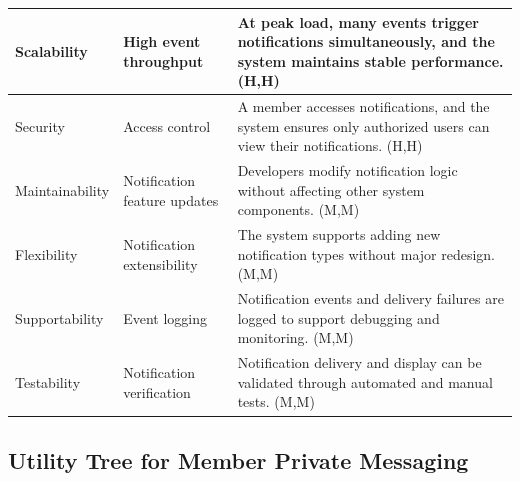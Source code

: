 \documentclass{article}
\begin{document}
\begin{table}[H]
\begin{tabular}{|p{3cm}|p{4cm}|p{7cm}|}
        Scalability
                                   & High event throughput
                                   & At peak load, many events trigger notifications simultaneously, and the system maintains stable performance. (H,H)                              \\
        \hline

        Security
                                   & Access control
                                   & A member accesses notifications, and the system ensures only authorized users can view their notifications. (H,H)                               \\
        \hline

        Maintainability
                                   & Notification feature updates
                                   & Developers modify notification logic without affecting other system components. (M,M)                                                           \\
        \hline

        Flexibility
                                   & Notification extensibility
                                   & The system supports adding new notification types without major redesign. (M,M)                                                                 \\
        \hline

        Supportability
                                   & Event logging
                                   & Notification events and delivery failures are logged to support debugging and monitoring. (M,M)                                                 \\
        \hline

        Testability
                                   & Notification verification
                                   & Notification delivery and display can be validated through automated and manual tests. (M,M)                                                    \\
        \hline
    \end{tabular}
\end{table}

\subsection{Utility Tree for Member Private Messaging}
\end{document}
